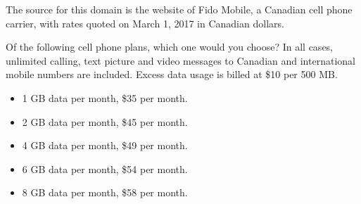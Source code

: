 The source for this domain is the website of Fido Mobile, a Canadian cell phone carrier, with rates quoted on March 1, 2017 in Canadian dollars.

\begin{tcolorbox}
Of the following cell phone plans, which one would you choose? In all cases, unlimited calling, text picture and video messages to Canadian and international mobile numbers are included. Excess data usage is billed at \$10 per 500 MB.

\begin{itemize}
	\setlength\itemsep{-5pt}
	\item 1 GB data per month, \$35 per month.
	\item 2 GB data per month, \$45 per month.
	\item 4 GB data per month, \$49 per month.
	\item 6 GB data per month, \$54 per month.
	\item 8 GB data per month, \$58 per month.
\end{itemize}
\end{tcolorbox}
